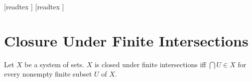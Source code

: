 \documentclass[10pt]{article}
\begin{document}
  \begin{imports}
    \begin{forthel}
      [readtex ]
      [readtex ]
    \end{forthel}
  \end{imports}


  \section*{Closure Under Finite Intersections}

  \begin{forthel}
    \begin{definition}
      Let $X$ be a system of sets.
      $X$ is closed under finite intersections iff $\bigcap U \in X$ for every nonempty finite subset $U$ of $X$.
    \end{definition}
  \end{forthel}
\end{document}
